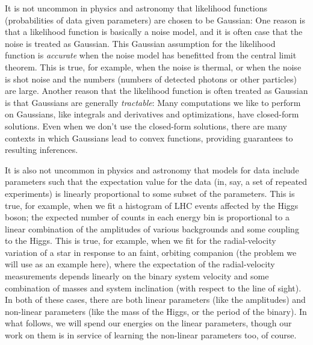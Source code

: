 It is not uncommon in physics and astronomy that likelihood functions
(probabilities of data given parameters) are chosen to be Gaussian:
One reason is that a likelihood function is basically a noise model,
and it is often case that the noise is treated as Gaussian.
This Gaussian assumption for the likelihood function is
\emph{accurate} when the noise model has benefitted from the central
limit theorem.
This is true, for example, when the noise is thermal, or when the
noise is shot noise and the numbers (numbers of detected photons or other
particles) are large.
Another reason that the likelihood function is often treated as
Gaussian is that Gaussians are generally \emph{tractable}:
Many computations we like to perform on Gaussians, like integrals and
derivatives and optimizations, have closed-form solutions.
Even when we don't use the closed-form solutions, there are many
contexts in which Gaussians lead to convex functions,
providing guarantees to resulting inferences.

It is also not uncommon in physics and astronomy that models for data
include parameters such that the expectation value for the data (in,
say, a set of repeated experiments) is linearly proportional to some
subset of the parameters.
This is true, for example, when we fit a histogram of LHC events
affected by the Higgs boson; the expected number of counts in each
energy bin is proportional to a linear combination of the amplitudes
of various backgrounds and some coupling to the Higgs.
This is true, for example, when we fit for the radial-velocity
variation of a star in response to an faint, orbiting companion (the
problem we will use as an example here), where the expectation of the
radial-velocity measurements depends linearly on the binary system
velocity and some combination of masses and system inclination (with
respect to the line of sight).
In both of these cases, there are both linear parameters (like the
amplitudes) and non-linear parameters (like the mass of the Higgs, or
the period of the binary).
In what follows, we will spend our energies on the linear parameters,
though our work on them is in service of learning the non-linear
parameters too, of course.

